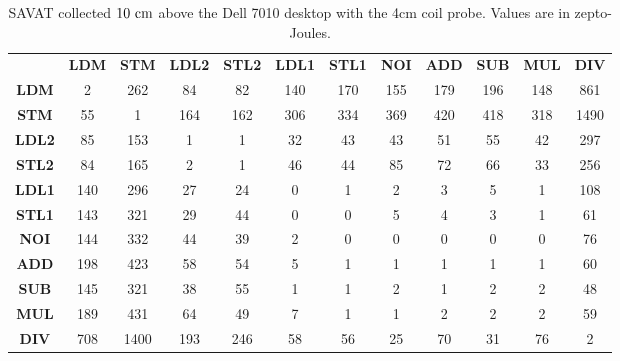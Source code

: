 \begin{table}[htb]
  \scriptsize
  \setlength{\tabcolsep}{2.3pt}
  \setlength\extrarowheight{1pt}
  \caption{SAVAT collected $10~{\rm cm}$ above the Dell 7010 desktop with the 4cm coil probe. Values are in zepto-Joules.}
  \begin{tabu}{|c||c|c|c|c|c|c|c|c|c|c|c|} \hline
    & \textbf{LDM} & \textbf{STM} & \textbf{LDL2} & \textbf{STL2} & \textbf{LDL1} & \textbf{STL1} & \textbf{NOI} & \textbf{ADD} & \textbf{SUB} & \textbf{MUL} & \textbf{DIV}
    \\ \hhline{|=||=|=|=|=|=|=|=|=|=|=|=|}
    \textbf{LDM} &  {2} &  {262} &  {84} &  {82} &  {140} &  {170} &  {155} &  {179} &  {196} &  {148} &  {861} \\ \hline
    \textbf{STM} &  {55} &  {1} &  {164} &  {162} &  {306} &  {334} &  {369} &  {420} &  {418} &  {318} &  {1490} \\ \hline
    \textbf{LDL2} &  {85} &  {153} &  {1} &  {1} &  {32} &  {43} &  {43} &  {51} &  {55} &  {42} &  {297} \\ \hline
    \textbf{STL2} &  {84} &  {165} &  {2} &  {1} &  {46} &  {44} &  {85} &  {72} &  {66} &  {33} &  {256} \\ \hline
    \textbf{LDL1} &  {140} &  {296} &  {27} &  {24} &  {0} &  {1} &  {2} &  {3} &  {5} &  {1} &  {108} \\ \hline
    \textbf{STL1} &  {143} &  {321} &  {29} &  {44} &  {0} &  {0} &  {5} &  {4} &  {3} &  {1} &  {61} \\ \hline
    \textbf{NOI} &  {144} &  {332} &  {44} &  {39} &  {2} &  {0} &  {0} &  {0} &  {0} &  {0} &  {76} \\ \hline
    \textbf{ADD} &  {198} &  {423} &  {58} &  {54} &  {5} &  {1} &  {1} &  {1} &  {1} &  {1} &  {60} \\ \hline
    \textbf{SUB} &  {145} &  {321} &  {38} &  {55} &  {1} &  {1} &  {2} &  {1} &  {2} &  {2} &  {48} \\ \hline
    \textbf{MUL} &  {189} &  {431} &  {64} &  {49} &  {7} &  {1} &  {1} &  {2} &  {2} &  {2} &  {59} \\ \hline
    \textbf{DIV} &  {708} &  {1400} &  {193} &  {246} &  {58} &  {56} &  {25} &  {70} &  {31} &  {76} &  {2} \\ \hline

  \end{tabu}
  \label{fig:desktop}
   \end{table}

